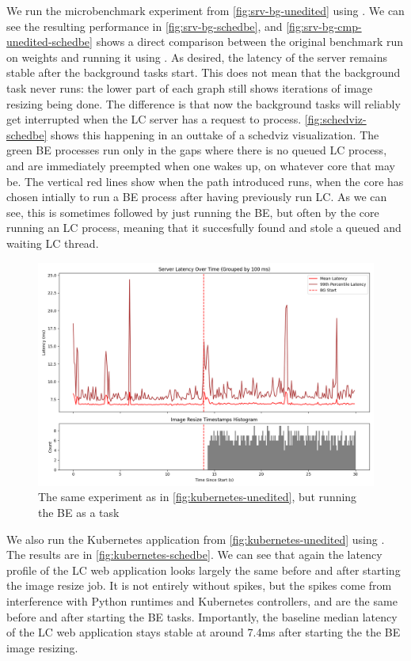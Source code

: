 We run the microbenchmark experiment from \autoref{fig:srv-bg-unedited} using
\schedbe{}. We can see the resulting performance in
\autoref{fig:srv-bg-schedbe}, and \autoref{fig:srv-bg-cmp-unedited-schedbe}
shows a direct comparison between the original benchmark run on \cgroups{}
weights and running it using \schedbe{}. As desired, the latency of the server
remains stable after the background tasks start. This does not mean that the
background task never runs: the lower part of each graph still shows iterations
of image resizing being done. The difference is that now the background tasks
will reliably get interrupted when the LC server has a request to process.
\autoref{fig:schedviz-schedbe} shows this happening in an outtake of a schedviz
visualization. The green BE processes run only in the gaps where there is no
queued LC process, and are immediately preempted when one wakes up, on whatever
core that may be. The vertical red lines show when the \exit{} path \schedbe{}
introduced runs, \ie{} when the core has chosen intially to run a BE process
after having previously run LC. As we can see, this is sometimes followed by
just running the BE, but often by the core running an LC process, meaning that
it succesfully found and stole a queued and waiting LC thread.

\begin{figure}[t]
    \centering
    \includegraphics[width=\columnwidth]{graphs/kubernetes-schedbe.png}
    \caption{The same experiment as in \autoref{fig:kubernetes-unedited}, but
    running the BE as a \schedbe{} task}\label{fig:kubernetes-schedbe}
\end{figure}

We also run the Kubernetes application from \autoref{fig:kubernetes-unedited}
using \schedbe{}. The results are in \autoref{fig:kubernetes-schedbe}. We can
see that again the latency profile of the LC web application looks largely the
same before and after starting the image resize job. It is not entirely without spikes, but the spikes come
from interference with Python runtimes and Kubernetes controllers, and are the
same before and after starting the BE tasks. Importantly, the baseline median
latency of the LC web application stays stable at around 7.4ms after starting
the the BE image resizing. 

